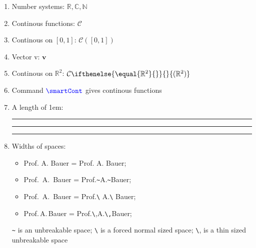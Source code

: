\documentclass[a4paper]{article}
\newcommand{\numR}{\mathbb{R}}
\newcommand{\numC}{\mathbb{C}}
\newcommand{\numN}{\mathbb{N}}
\newcommand{\cont}{\mathcal{C}}
\newcommand{\continousOn}[1]{\cont(#1)}
\newcommand{\vect}[1]{\mathbf{#1}}
\newcommand{\smartCont}[1][]{
    \cont%
    \ifthenelse{\equal{#1}{}}
        {}
        {(#1)}
}
\newcommand{\cmd}[1]{\textcolor{blue}{\texttt{\textbackslash#1}}}
\newcommand{\demolength}[1]{
    \rule{.1pt}{.5em}%
    \rule{#1}{.1pt}%
    \rule{.1pt}{.5em}
}
\begin{document}
\Large
\begin{enumerate}
    \item Number systems: $\numR, \numC, \numN$
    \item Continous functions: $\cont$
    \item Continous on $[0,1]$: $\continousOn{[0,1]}$
    \item Vector v: $\vect{v}$
    \item Continous on $\numR^2$: $\smartCont[\numR^2]$
    \item Command $\cmd{smartCont}$ gives continous functions
    \item A length of 1em: \demolength{1em}
    \item Widths of spaces:
    \begin{itemize}
        \item Prof. A. Bauer = Prof. A. Bauer;
        \item Prof.~A.~Bauer = Prof.\texttt{\textasciitilde}A.\texttt{\textasciitilde}Bauer;
        \item Prof.\ A.\ Bauer = Prof.\texttt{\textbackslash} A.\texttt{\textbackslash} Bauer;
        \item Prof.\,A.\,Bauer = Prof.\texttt{\textbackslash},A.\texttt{\textbackslash,}Bauer;
    \end{itemize}
    \texttt{\textasciitilde} is an unbreakable space;
    \texttt{\textbackslash}  is a forced normal sized space;
    \texttt{\textbackslash}, is a thin sized unbreakable space
\end{enumerate}
\end{document}
